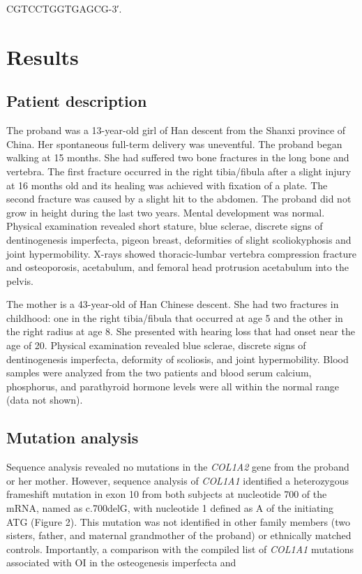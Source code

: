 CGTCCTGGTGAGCG-3′.\section*{Results}\subsection*{Patient description}\par The proband was a 13-year-old girl of Han descent from the Shanxi province of China. Her spontaneous full-term delivery was uneventful. The proband began walking at 15 months. She had suffered two bone fractures in the long bone and vertebra. The first fracture occurred in the right tibia/fibula after a slight injury at 16 months old and its healing was achieved with fixation of a plate. The second fracture was caused by a slight hit to the abdomen. The proband did not grow in height during the last two years. Mental development was normal. Physical examination revealed short stature, blue sclerae, discrete signs of dentinogenesis imperfecta, pigeon breast, deformities of slight scoliokyphosis and joint hypermobility. X-rays showed thoracic-lumbar vertebra compression fracture and osteoporosis, acetabulum, and femoral head protrusion acetabulum into the pelvis.\par The mother is a 43-year-old of Han Chinese descent. She had two fractures in childhood: one in the right tibia/fibula that occurred at age 5 and the other in the right radius at age 8. She presented with hearing loss that had onset near the age of 20. Physical examination revealed blue sclerae, discrete signs of dentinogenesis imperfecta, deformity of scoliosis, and joint hypermobility. Blood samples were analyzed from the two patients and blood serum calcium, phosphorus, and parathyroid hormone levels were all within the normal range (data not shown).\subsection*{Mutation analysis}\par Sequence analysis revealed no mutations in the \textit{COL1A2} gene from the proband or her mother. However, sequence analysis of \textit{COL1A1} identified a heterozygous frameshift mutation in exon 10 from both subjects at nucleotide 700 of the mRNA, named as c.700delG, with nucleotide 1 defined as A of the initiating ATG (Figure 2). This mutation was not identified in other family members (two sisters, father, and maternal grandmother of the proband) or ethnically matched controls. Importantly, a comparison with the compiled list of \textit{COL1A1} mutations associated with OI in the osteogenesis imperfecta and 